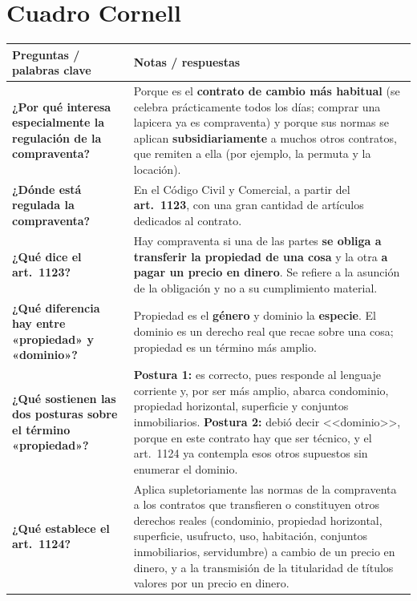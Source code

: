 \documentclass[12pt,oneside]{book}
\begin{document}
\section{Cuadro Cornell}

\begin{longtable}{@{}>{\raggedright\arraybackslash}p{}>{\raggedright\arraybackslash}p{}@{}}
\toprule
\textbf{Preguntas / palabras clave} & \textbf{Notas / respuestas} \\
\midrule
\endhead

\textbf{¿Por qué interesa especialmente la regulación de la compraventa?} &
Porque es el \textbf{contrato de cambio más habitual} (se celebra prácticamente todos los días; comprar una lapicera ya es compraventa) y porque sus normas se aplican \textbf{subsidiariamente} a muchos otros contratos, que remiten a ella (por ejemplo, la permuta y la locación). \\[0.8em]

\textbf{¿Dónde está regulada la compraventa?} &
En el Código Civil y Comercial, a partir del \textbf{art.~1123}, con una gran cantidad de artículos dedicados al contrato. \\[0.8em]

\textbf{¿Qué dice el art.~1123?} &
Hay compraventa si una de las partes \textbf{se obliga a transferir la propiedad de una cosa} y la otra \textbf{a pagar un precio en dinero}. Se refiere a la asunción de la obligación y no a su cumplimiento material. \\[0.8em]

\textbf{¿Qué diferencia hay entre «propiedad» y «dominio»?} &
Propiedad es el \textbf{género} y dominio la \textbf{especie}. El dominio es un derecho real que recae sobre una cosa; propiedad es un término más amplio. \\[0.8em]

\textbf{¿Qué sostienen las dos posturas sobre el término «propiedad»?} &
\textbf{Postura 1:} es correcto, pues responde al lenguaje corriente y, por ser más amplio, abarca condominio, propiedad horizontal, superficie y conjuntos inmobiliarios. \textbf{Postura 2:} debió decir <<dominio>>, porque en este contrato hay que ser técnico, y el art.~1124 ya contempla esos otros supuestos sin enumerar el dominio. \\[0.8em]

\textbf{¿Qué establece el art.~1124?} &
Aplica supletoriamente las normas de la compraventa a los contratos que transfieren o constituyen otros derechos reales (condominio, propiedad horizontal, superficie, usufructo, uso, habitación, conjuntos inmobiliarios, servidumbre) a cambio de un precio en dinero, y a la transmisión de la titularidad de títulos valores por un precio en dinero. \\[0.8em]


\end{longtable}
\end{document}
